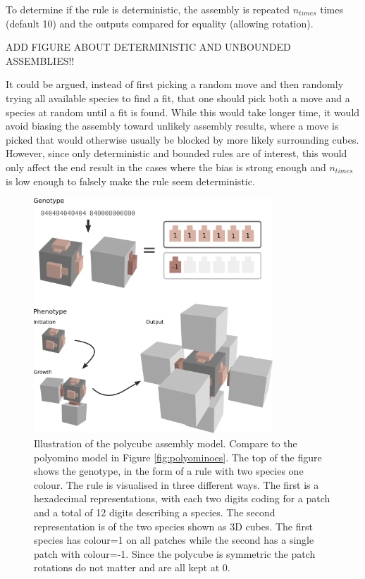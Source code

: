 To determine if the rule is deterministic, the assembly is repeated \(n_{times}\) times (default 10) and the outputs compared for equality (allowing rotation).

ADD FIGURE ABOUT DETERMINISTIC AND UNBOUNDED ASSEMBLIES!!

It could be argued, instead of first picking a random move and then randomly trying all available species to find a fit, that one should pick both a move and a species at random until a fit is found. While this would take longer time, it would avoid biasing the assembly toward unlikely assembly results, where a move is picked that would otherwise usually be blocked by more likely surrounding cubes. However, since only deterministic and bounded rules are of interest, this would only affect the end result in the cases where the bias is strong enough and \(n_{times}\) is low enough to falsely make the rule seem deterministic.

\begin{figure}
\centering\includegraphics[width=0.8\textwidth]{figures/rule.eps} 
\caption{Illustration of the polycube assembly model. Compare to the polyomino model in Figure \ref{fig:polyominoes}. The top of the figure shows the genotype, in the form of a rule with two species one colour. The rule is visualised in three different ways. The first is a hexadecimal representations, with each two digits coding for a patch and a total of 12 digits describing a species. The second representation is of the two species shown as 3D cubes. The first species has colour=1 on all patches while the second has a single patch with colour=-1. Since the polycube is symmetric the patch rotations do not matter and are all kept at 0.}
\label{fig:polycubeRule}\end{figure}

